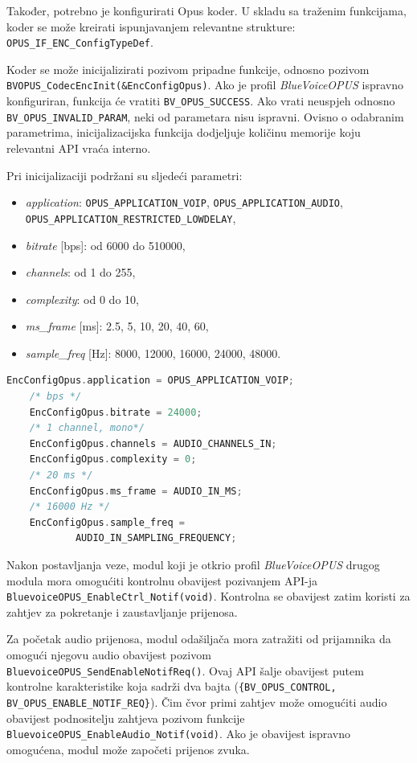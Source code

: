 Također, potrebno je konfigurirati Opus koder. U skladu sa traženim funkcijama, koder se može kreirati ispunjavanjem relevantne strukture: \newline \lstinline|OPUS_IF_ENC_ConfigTypeDef|.

Koder se može inicijalizirati pozivom pripadne funkcije, odnosno pozivom \newline \lstinline|BVOPUS_CodecEncInit(&EncConfigOpus)|. Ako je profil \textit{BlueVoiceOPUS} ispravno konfiguriran, funkcija će vratiti \lstinline|BV_OPUS_SUCCESS|. Ako vrati neuspjeh odnosno \lstinline|BV_OPUS_INVALID_PARAM|, neki od parametara nisu ispravni. Ovisno o odabranim parametrima, inicijalizacijska funkcija dodjeljuje količinu memorije koju relevantni API vraća interno. 

Pri inicijalizaciji podržani su sljedeći parametri:
\begin{itemize}
	\item \textit{application}: \lstinline|OPUS_APPLICATION_VOIP|, 
	\lstinline|OPUS_APPLICATION_AUDIO|, \lstinline|OPUS_APPLICATION_RESTRICTED_LOWDELAY|,
	\item \textit{bitrate} [bps]: od 6000 do 510000,
	\item \textit{channels}: od 1 do 255,
	\item \textit{complexity}: od 0 do 10,
	\item \textit{ms\_frame} [ms]: 2.5, 5, 10, 20, 40, 60,
	\item \textit{sample\_freq} [Hz]: 8000, 12000, 16000, 24000, 48000.
\end{itemize}

\begin{lstlisting}[caption={Parametri za Opus koder}, language=c]
	EncConfigOpus.application = OPUS_APPLICATION_VOIP;
	/* bps */
	EncConfigOpus.bitrate = 24000; 
	/* 1 channel, mono*/
	EncConfigOpus.channels = AUDIO_CHANNELS_IN; 
	EncConfigOpus.complexity = 0;
	/* 20 ms */
	EncConfigOpus.ms_frame = AUDIO_IN_MS; 
	/* 16000 Hz */
	EncConfigOpus.sample_freq = 
			AUDIO_IN_SAMPLING_FREQUENCY; 
\end{lstlisting}

Nakon postavljanja veze, modul koji je otkrio profil \textit{BlueVoiceOPUS} drugog modula mora omogućiti kontrolnu obavijest pozivanjem API-ja \newline \lstinline|BluevoiceOPUS_EnableCtrl_Notif(void)|. Kontrolna se obavijest zatim koristi za zahtjev za pokretanje i zaustavljanje prijenosa.

Za početak audio prijenosa, modul odašiljača mora zatražiti od prijamnika da omogući njegovu audio obavijest pozivom \lstinline|BluevoiceOPUS_SendEnableNotifReq()|. Ovaj API šalje obavijest putem kontrolne karakteristike koja sadrži dva bajta (\lstinline|{BV_OPUS_CONTROL, BV_OPUS_ENABLE_NOTIF_REQ}|). Čim čvor primi zahtjev može omogućiti audio obavijest podnositelju zahtjeva pozivom funkcije \newline \lstinline|BluevoiceOPUS_EnableAudio_Notif(void)|. Ako je obavijest ispravno omogućena, modul može započeti prijenos zvuka.

